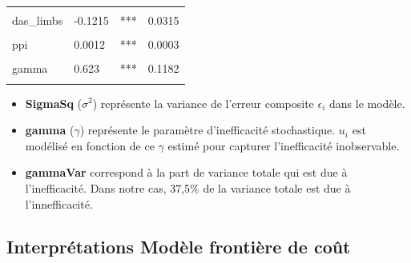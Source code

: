 \documentclass[
  12pt,
]{report}
\begin{document}
\begin{table}[!h]
\begin{tabular}[t]{llll}
\cellcolor{gray!10}{upgrade\_storageTRUE} & \cellcolor{gray!10}{-0.2619} & \cellcolor{gray!10}{***} & \cellcolor{gray!10}{0.0455}\\
das\_limbs & -0.1215 & *** & 0.0315\\
\addlinespace
\cellcolor{gray!10}{network5G} & \cellcolor{gray!10}{0.2022} & \cellcolor{gray!10}{***} & \cellcolor{gray!10}{0.0382}\\
ppi & 0.0012 & *** & 0.0003\\
\cellcolor{gray!10}{sigmaSq} & \cellcolor{gray!10}{0.0861} & \cellcolor{gray!10}{***} & \cellcolor{gray!10}{0.0132}\\
gamma & 0.623 & *** & 0.1182\\
\cellcolor{gray!10}{gammaVar} & \cellcolor{gray!10}{0.3752} & \cellcolor{gray!10}{} & \cellcolor{gray!10}{}\\
\bottomrule
\end{tabular}
\end{table}

\vspace{2em}

\begin{itemize}
\item
  \textbf{SigmaSq} (\(\sigma^2\)) représente la variance de l'erreur
  composite \(\epsilon_i\) dans le modèle.
\item
  \textbf{gamma} (\(\gamma\)) représente le paramètre d'inefficacité
  stochastique. \(u_i\)\hspace{0pt} est modélisé en fonction de ce
  \(\gamma\) estimé pour capturer l'inefficacité inobservable.
\item
  \textbf{gammaVar} correspond à la part de variance totale qui est due
  à l'inefficacité. Dans notre cas, 37,5\% de la variance totale est due
  à l'innefficacité.
\end{itemize}

\newpage

\subsection{Interprétations Modèle frontière de
coût}\label{interpruxe9tations-moduxe8le-frontiuxe8re-de-couxfbt}
\end{document}
